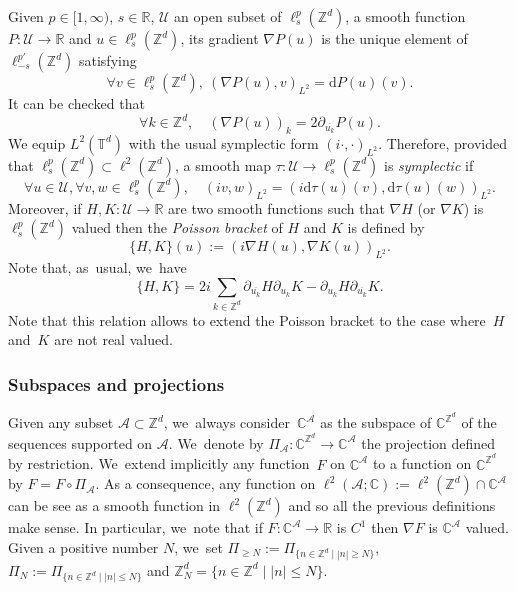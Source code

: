 \documentclass[JEP,XML,SOM,Unicode,published]{cedram}
\theoremstyle{plain}
\theoremstyle{definition}
\newcommand{\1}{\mathbf{1}}
\begin{document}
Given $p\in[1,\infty)$, $s\in \mathbb{R}$, $\mathcal{U}$ an open subset of $\ell^p_s(\mathbb{Z}^d) $, a smooth function $P :\mathcal{U} \to \mathbb{R}$ and $u\in \ell^p_s(\mathbb{Z}^d)$, its gradient $\nabla P(u)$ is the unique element of $\ell^{p'}_{-s}(\mathbb{Z}^d)$ satisfying
\[
\forall v\in \ell^p_s(\mathbb{Z}^d), \ (\nabla P(u),v)_{L^2} = \mathrm{d}P(u)(v).
\]
It can be checked that
\begin{equation}
\label{eq:formula_grad}
\forall k \in \mathbb{Z}^d, \quad (\nabla P(u))_k = 2\partial_{\overline{u_k}} P(u).
\end{equation}
We equip $L^2(\mathbb{T}^d)$ with the usual symplectic form $(i\cdot,\cdot)_{L^2}$. Therefore, provided that $\ell^p_s(\mathbb{Z}^d) \subset \ell^2(\mathbb{Z}^d)$, a smooth map $\tau : \mathcal{U} \to \ell^p_s(\mathbb{Z}^d)$ is \emph{symplectic} if
\[
\forall u \in \mathcal{U}, \forall v,w \in \ell^p_s(\mathbb{Z}^d), \quad (iv,w)_{L^2} = (i\mathrm{d}\tau(u)(v),\mathrm{d}\tau(u)(w))_{L^2}.
\]
Moreover, if $H,K : \mathcal{U} \to \mathbb{R}$ are two smooth functions such that $\nabla H$ (or $\nabla K$) is $ \ell^p_s(\mathbb{Z}^d)$ valued then the \emph{Poisson bracket} of $H$ and $K$ is defined by
\[
\{ H,K\}(u):= (i \nabla H(u),\nabla K(u))_{L^2}.
\]
Note that, as~usual, we~have
\begin{equation}
\label{eq:pois-brak}
\{ H,K\}
=2i \sum_{k\in \mathbb{Z}^d} \partial_{\overline{u_k}}H \partial_{u_k} K - \partial_{u_k}H \partial_{\overline{u_k}} K.
\end{equation}
Note that this relation allows to extend the Poisson bracket to the case where~$H$ and~$K$ are not real valued.

\subsubsection{Subspaces and projections}
Given any subset $\mathcal{A} \subset \mathbb{Z}^d$, we~always consider~$\mathbb{C}^{\mathcal{A}}$ as the subspace of $\mathbb{C}^{\mathbb{Z}^d}$ of the sequences supported on $\mathcal{A}$. We~denote by $\Pi_{\mathcal{A}} : \mathbb{C}^{\mathbb{Z}^d} \to \mathbb{C}^{\mathcal{A}}$ the projection defined by restriction. We~extend implicitly any function~$F$ on $\mathbb{C}^{\mathcal{A}}$ to a function on $\mathbb{C}^{\mathbb{Z}^d}$ by $F=F\circ \Pi_{\mathcal{A}}$. As a consequence, any function on $\ell^2(\mathcal{A};\mathbb{C}):=\ell^2(\mathbb{Z}^d) \cap \mathbb{C}^{\mathcal{A}}$ can be see as a smooth function in $\ell^2(\mathbb{Z}^d)$ and so all the previous definitions make sense. In particular, we~note that if $F : \mathbb{C}^{\mathcal{A}} \to \mathbb{R} $ is $C^1$ then $\nabla F$ is $\mathbb{C}^{\mathcal{A}}$ valued. Given a positive number $N$, we~set $\Pi_{\geq N} := \Pi_{ \{ n \in \mathbb{Z}^d \mid |n| \geq N \} }$, $\Pi_{N} := \Pi_{ \{ n \in \mathbb{Z}^d \mid |n| \leq N \} }$ and $\mathbb{Z}^d_N = \{n \in \mathbb{Z}^d \mid |n| \leq N \}$.
\end{document}
